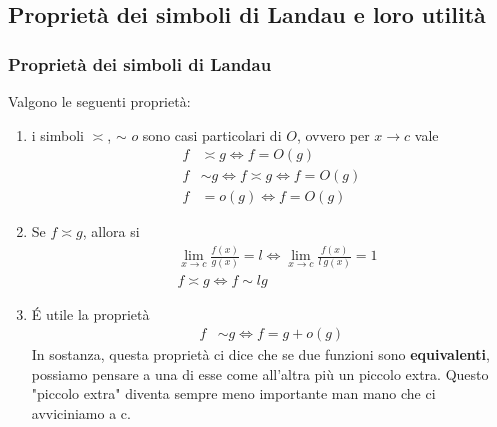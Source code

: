 \documentclass{book}
\begin{document}
\subsection{Proprietà dei simboli di Landau e loro utilità}
\noindent\begin{minipage}{\textwidth}
    \begin{proposition}
        \subsubsection{Proprietà dei simboli di Landau}
        Valgono le seguenti proprietà:
        \begin{enumerate}[label=\roman*., start=1]
            \item i simboli \(\asymp\), \(\sim\) \(o\) sono casi particolari di \(O\), ovvero per \(x \to c\) vale
                  \begin{align*}
                      f & \asymp g \iff f = O(g)               \\
                      f & \sim g \iff f \asymp g \iff f = O(g) \\
                      f & = o(g) \iff f = O(g)
                  \end{align*}
            \item Se \(f \asymp g\), allora si
                  \begin{align*}
                       & \lim_{x \to c} \frac{f(x)}{g(x)} = l \iff  \lim_{x \to c} \frac{f(x)}{l\ g(x)} = 1 \\
                       & f \asymp g \iff f \sim lg
                  \end{align*}
            \item \'E utile la proprietà
                  \begin{align*}
                      f & \sim g \iff f = g + o(g)
                  \end{align*}
                  In sostanza, questa proprietà ci dice che se due funzioni sono \textbf{equivalenti}, possiamo pensare a una di esse come all'altra più un piccolo extra. Questo "piccolo extra" diventa sempre meno importante man mano che ci avviciniamo a c.


\end{enumerate}
\end{proposition}
\end{minipage}
\end{document}
